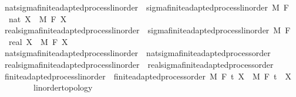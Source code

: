\begin{isabellebody}
\isanewline
{}\isamarkupfalse%
\ nat{\isacharunderscore}{\kern0pt}sigma{\isacharunderscore}{\kern0pt}finite{\isacharunderscore}{\kern0pt}adapted{\isacharunderscore}{\kern0pt}process{\isacharunderscore}{\kern0pt}linorder\ {\isacharequal}{\kern0pt}\ sigma{\isacharunderscore}{\kern0pt}finite{\isacharunderscore}{\kern0pt}adapted{\isacharunderscore}{\kern0pt}process{\isacharunderscore}{\kern0pt}linorder\ M\ F\ {\isachardoublequoteopen}{}\ {\isacharcolon}{\kern0pt}{\isacharcolon}{\kern0pt}\ nat{\isachardoublequoteclose}\ X\ \ M\ F\ X\isanewline
{}\isamarkupfalse%
\ real{\isacharunderscore}{\kern0pt}sigma{\isacharunderscore}{\kern0pt}finite{\isacharunderscore}{\kern0pt}adapted{\isacharunderscore}{\kern0pt}process{\isacharunderscore}{\kern0pt}linorder\ {\isacharequal}{\kern0pt}\ sigma{\isacharunderscore}{\kern0pt}finite{\isacharunderscore}{\kern0pt}adapted{\isacharunderscore}{\kern0pt}process{\isacharunderscore}{\kern0pt}linorder\ M\ F\ {\isachardoublequoteopen}{}\ {\isacharcolon}{\kern0pt}{\isacharcolon}{\kern0pt}\ real{\isachardoublequoteclose}\ X\ \ M\ F\ X\isanewline
\isanewline
{}\isamarkupfalse%
\ nat{\isacharunderscore}{\kern0pt}sigma{\isacharunderscore}{\kern0pt}finite{\isacharunderscore}{\kern0pt}adapted{\isacharunderscore}{\kern0pt}process{\isacharunderscore}{\kern0pt}linorder\ {\isasymsubseteq}\ nat{\isacharunderscore}{\kern0pt}sigma{\isacharunderscore}{\kern0pt}finite{\isacharunderscore}{\kern0pt}adapted{\isacharunderscore}{\kern0pt}process{\isacharunderscore}{\kern0pt}order%
\isadelimproof
\ %
\endisadelimproof
%
\isatagproof
\isacommand{{\isachardot}{\kern0pt}{\isachardot}{\kern0pt}}\isamarkupfalse%
%
\endisatagproof
{\isafoldproof}%
%
\isadelimproof
%
\endisadelimproof
\isanewline
{}\isamarkupfalse%
\ real{\isacharunderscore}{\kern0pt}sigma{\isacharunderscore}{\kern0pt}finite{\isacharunderscore}{\kern0pt}adapted{\isacharunderscore}{\kern0pt}process{\isacharunderscore}{\kern0pt}linorder\ {\isasymsubseteq}\ real{\isacharunderscore}{\kern0pt}sigma{\isacharunderscore}{\kern0pt}finite{\isacharunderscore}{\kern0pt}adapted{\isacharunderscore}{\kern0pt}process{\isacharunderscore}{\kern0pt}order%
\isadelimproof
\ %
\endisadelimproof
%
\isatagproof
\isacommand{{\isachardot}{\kern0pt}{\isachardot}{\kern0pt}}\isamarkupfalse%
%
\endisatagproof
{\isafoldproof}%
%
\isadelimproof
%
\endisadelimproof
\isanewline
\isanewline
{}\isamarkupfalse%
\ finite{\isacharunderscore}{\kern0pt}adapted{\isacharunderscore}{\kern0pt}process{\isacharunderscore}{\kern0pt}linorder\ {\isacharequal}{\kern0pt}\ finite{\isacharunderscore}{\kern0pt}adapted{\isacharunderscore}{\kern0pt}process{\isacharunderscore}{\kern0pt}order\ M\ F\ t\ X\ \ M\ F\ t\ \ X\ {\isacharcolon}{\kern0pt}{\isacharcolon}{\kern0pt}\ {\isachardoublequoteopen}{\isacharunderscore}{\kern0pt}\ \ {\isasymRightarrow}\ {\isacharunderscore}{\kern0pt}\ {\isasymRightarrow}\ {\isacharunderscore}{\kern0pt}\ {\isacharcolon}{\kern0pt}{\isacharcolon}{\kern0pt}\ {\isacharbraceleft}{\kern0pt}linorder{\isacharunderscore}{\kern0pt}topology{\isacharbraceright}{\kern0pt}{\isachardoublequoteclose}\isanewline

\end{isabellebody}
